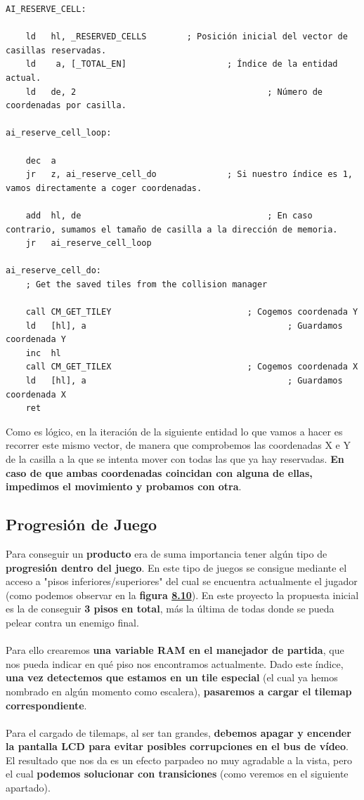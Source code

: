 \begin{lstlisting}[caption={Reserva de Casillas}, label={code:reservetiles}]
AI_RESERVE_CELL:

	ld 	 hl, _RESERVED_CELLS 		; Posición inicial del vector de casillas reservadas.
	ld 	  a, [_TOTAL_EN] 					; Índice de la entidad actual.
	ld 	 de, 2 										; Número de coordenadas por casilla.
 	
ai_reserve_cell_loop:

 	dec  a
 	jr 	 z, ai_reserve_cell_do 			 	; Si nuestro índice es 1, vamos directamente a coger coordenadas.

 	add  hl, de 									; En caso contrario, sumamos el tamaño de casilla a la dirección de memoria.
 	jr 	 ai_reserve_cell_loop

ai_reserve_cell_do:
	; Get the saved tiles from the collision manager

	call CM_GET_TILEY 							; Cogemos coordenada Y
	ld 	 [hl], a 										; Guardamos coordenada Y
	inc  hl 											
	call CM_GET_TILEX 							; Cogemos coordenada X
	ld 	 [hl], a 										; Guardamos coordenada X
	ret
\end{lstlisting}

Como es lógico, en la iteración de la siguiente entidad lo que vamos a hacer es recorrer este mismo vector, de manera que comprobemos las coordenadas X e Y de la casilla a la que se intenta mover con todas las que ya hay reservadas. \textbf{En caso de que ambas coordenadas coincidan con alguna de ellas, impedimos el movimiento y probamos con otra}.

\subsection{Progresión de Juego}

Para conseguir un \textbf{producto} era de suma importancia tener algún tipo de \textbf{progresión dentro del juego}. En este tipo de juegos se consigue mediante el acceso a "pisos inferiores/superiores" del cual se encuentra actualmente el jugador (como podemos observar en la \textbf{figura \hyperref[figure:lifebar]{8.10}}). En este proyecto la propuesta inicial es la de conseguir \textbf{3 pisos en total}, más la última de todas donde se pueda pelear contra un enemigo final.
\\ \\
Para ello crearemos \textbf{una variable RAM en el manejador de partida}, que nos pueda indicar en qué piso nos encontramos actualmente. Dado este índice, \textbf{una vez detectemos que estamos en un tile especial} (el cual ya hemos nombrado en algún momento como escalera), \textbf{pasaremos a cargar el tilemap correspondiente}.
\\ \\
Para el cargado de tilemaps, al ser tan grandes, \textbf{debemos apagar y encender la pantalla LCD para evitar posibles corrupciones en el bus de vídeo}. El resultado que nos da es un efecto parpadeo no muy agradable a la vista, pero el cual \textbf{podemos solucionar con transiciones} (como veremos en el siguiente apartado).


